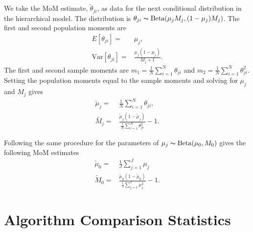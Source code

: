 \documentclass[11pt,reqno]{amsart}
\begin{document}
We take the MoM estimate, $\tilde{\theta}_{ji}$, as data for the next conditional distribution in the hierarchical model. The distribution is $\theta_{ji} \thicksim \text{Beta}(\mu_jM_j, (1-\mu_j)M_j)$. The first and second population moments are
\begin{eqnarray}
	E[\theta_{ji}] =& \mu_j,\\
	\text{Var}[\theta_{ji}] =& \frac{\mu_j(1-\mu_j)} { M_j + 1 }.
\end{eqnarray}
The first and second sample moments are $m_1 = \frac{1}{N}\sum_{i=1}^N \theta_{ji}$ and $m_2 = \frac{1}{N}\sum_{i=1}^N \theta_{ji}^2$. Setting the population moments equal to the sample moments and solving for $\mu_j$ and $M_j$ gives
\begin{eqnarray}
	\tilde{\mu}_j =& \frac{1}{N} \sum_{i=1}^N \theta_{ji}, \\
	\tilde{M_j} =& \frac{ \tilde{\mu}_j (1 - \tilde{\mu}_j ) } { \frac{1}{N} \sum_{i=1}^N \theta_{ji}^2 } -1.
\end{eqnarray}

Following the same procedure for the parameters of $\mu_j \thicksim \text{Beta}(\mu_0, M_0)$ gives the following MoM estimates
\begin{eqnarray}
	\tilde{\mu}_0 =& \frac{1}{J} \sum_{j=1}^J \mu_j \\
	\tilde{M}_0 =& \frac{ \tilde{\mu}_0 (1 - \tilde{\mu}_0 ) } {\frac{1}{J} \sum_{j=1}^J \mu_j^2 } -1.
\end{eqnarray}

\section{Algorithm Comparison Statistics}\label{sec:app_comparison}
\end{document}
